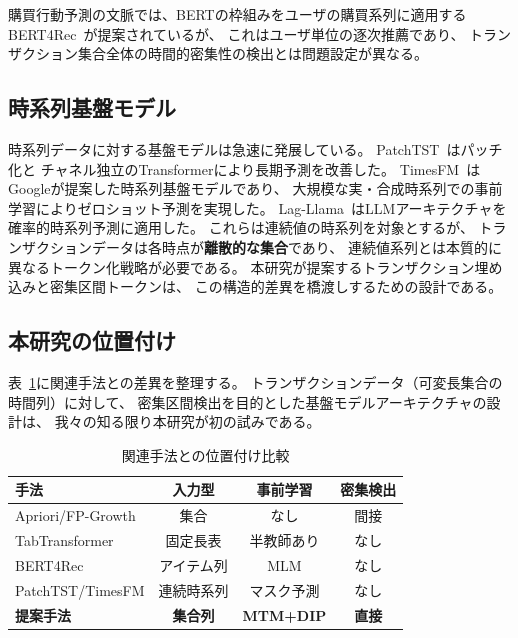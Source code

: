 \documentclass[sigconf,nonacm]{acmart}
\begin{document}
購買行動予測の文脈では、BERTの枠組みをユーザの購買系列に適用する
BERT4Rec~\cite{sun2019bert4rec}が提案されているが、
これはユーザ単位の逐次推薦であり、
トランザクション集合全体の時間的密集性の検出とは問題設定が異なる。

\subsection{時系列基盤モデル}

時系列データに対する基盤モデルは急速に発展している。
PatchTST~\cite{nie2023patchtst}はパッチ化と
チャネル独立のTransformerにより長期予測を改善した。
TimesFM~\cite{das2024timesfm}はGoogleが提案した時系列基盤モデルであり、
大規模な実・合成時系列での事前学習によりゼロショット予測を実現した。
Lag-Llama~\cite{rasul2024lagllama}はLLMアーキテクチャを確率的時系列予測に適用した。
これらは連続値の時系列を対象とするが、
トランザクションデータは各時点が\textbf{離散的な集合}であり、
連続値系列とは本質的に異なるトークン化戦略が必要である。
本研究が提案するトランザクション埋め込みと密集区間トークンは、
この構造的差異を橋渡しするための設計である。

\subsection{本研究の位置付け}

表~\ref{tab:positioning}に関連手法との差異を整理する。
トランザクションデータ（可変長集合の時間列）に対して、
密集区間検出を目的とした基盤モデルアーキテクチャの設計は、
我々の知る限り本研究が初の試みである。

\begin{table}[t]
\centering
\caption{関連手法との位置付け比較}
\label{tab:positioning}
\begin{tabular}{lccc}
\toprule
手法 & 入力型 & 事前学習 & 密集検出 \\
\midrule
Apriori/FP-Growth & 集合 & なし & 間接 \\
TabTransformer & 固定長表 & 半教師あり & なし \\
BERT4Rec & アイテム列 & MLM & なし \\
PatchTST/TimesFM & 連続時系列 & マスク予測 & なし \\
\textbf{提案手法} & \textbf{集合列} & \textbf{MTM+DIP} & \textbf{直接} \\
\bottomrule
\end{tabular}
\end{table}

\end{document}
